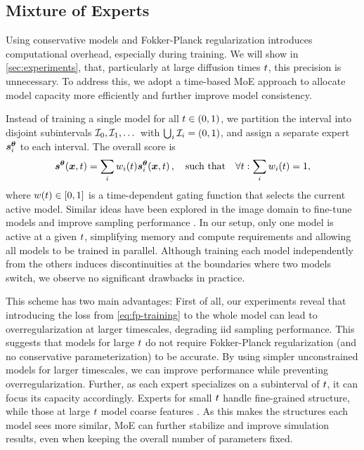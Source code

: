 \subsection{Mixture of Experts}
Using conservative models and Fokker-Planck regularization introduces computational overhead, especially during training. We will show in \cref{sec:experiments}, that, particularly at large diffusion times ${t}$, this precision is unnecessary. To address this, we adopt a time-based \gls{MoE} approach to allocate model capacity more efficiently and further improve model consistency.

Instead of training a single model for all ${t} \in (0, 1)$, we partition the interval into disjoint subintervals ${\mathcal{I}}_0, {\mathcal{I}}_1, \dots$ with $\bigcup_i {\mathcal{I}}_i = (0, 1)$, and assign a separate expert ${{\bm{s}}^{\bm{\theta}}_{i}}$ to each interval. The overall score is
\begin{equation}
    {{\bm{s}}^{\bm{\theta}}}({{\bm{x}}}, {t}) = \sum_i w_i({t}) {{\bm{s}}^{\bm{\theta}}_{i}}({{\bm{x}}}, {t}) \,, \quad \text{such that} \quad \forall {t}: \sum_i w_i({t}) = 1,
\end{equation}
where $w({t}) \in [0, 1]$ is a time-dependent gating function that selects the current active model. Similar ideas have been explored in the image domain to fine-tune models and improve sampling performance \citep{balaji2023ediffi, ganjdanesh2025mixture}. In our setup, only one model is active at a given ${t}$, simplifying memory and compute requirements and allowing all models to be trained in parallel.
Although training each model independently from the others induces discontinuities at the boundaries where two models switch, we observe no significant drawbacks in practice.

This scheme has two main advantages:
First of all, our experiments reveal that introducing the loss from \cref{eq:fp-training} to the whole model can lead to overregularization at larger timescales, degrading iid sampling performance. This suggests that models for large ${t}$ do not require Fokker-Planck regularization (and no conservative parameterization) to be accurate. By using simpler unconstrained models for larger timescales, we can improve performance while preventing overregularization. 
Further, as each expert specializes on a subinterval of ${t}$, it can focus its capacity accordingly. Experts for small ${t}$ handle fine-grained structure, while those at large ${t}$ model coarse features \citep{ganjdanesh2025mixture}. As this makes the structures each model sees more similar, \gls{MoE} can further stabilize and improve simulation results, even when keeping the overall number of parameters fixed.